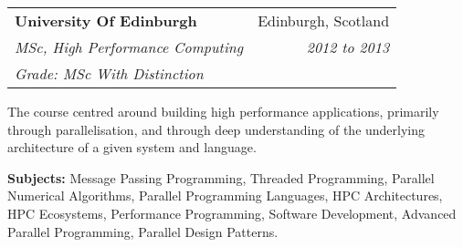 \documentclass[11pt]{article}
\makeatletter
\newenvironment{resumeSubSectionHeader}{
    \par
    \begin{tabular*}{\textwidth}{l@{\extracolsep{\fill}}r}
    \par
} {
    \end{tabular*}
    \par
}
\newenvironment{resumeSubSectionBody}{
    \par
    \vspace{-0.8\parskip}
    \begin{small}
    \par
} {
    \par
    \end{small}
    \par
}
\makeatother
\begin{document}
%
%
\begin{resumeSubSectionHeader}

    \textbf{University Of Edinburgh}       & Edinburgh, Scotland \\
    \emph{MSc, High Performance Computing} & \emph{2012 to 2013} \\
    \emph{Grade: MSc With Distinction}

\end{resumeSubSectionHeader}
\begin{resumeSubSectionBody}

    The course centred around building high performance applications,
    primarily through parallelisation, and through deep understanding
    of the underlying architecture of a given system and language.

    \begin{description}
        \item{\bf Subjects:}
            Message Passing Programming, Threaded Programming,
            Parallel Numerical Algorithms,
            Parallel Programming Languages, HPC Architectures,
            HPC Ecosystems, Performance Programming,
            Software Development, Advanced Parallel Programming,
            Parallel Design Patterns.
    \end{description}

\end{resumeSubSectionBody}
\end{document}
